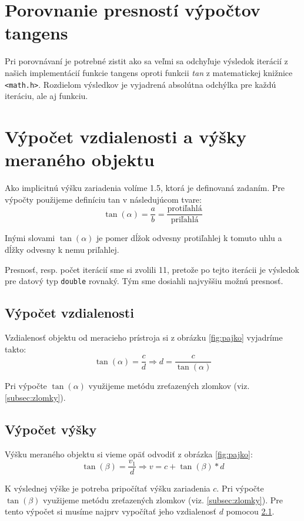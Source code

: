 \documentclass[12pt,a4paper,titlepage,final]{report}
\begin{document}
\section{Porovnanie presností výpočtov tangens}
Pri porovnávaní je potrebné zistit ako sa veľmi sa odchyľuje výsledok iterácií z našich implementácií funkcie tangens oproti funkcii \textit{tan} z matematickej knižnice \texttt{<math.h>}. Rozdielom výsledkov je vyjadrená absolútna odchýlka pre každú iteráciu, ale aj funkciu.

\section{Výpočet vzdialenosti a výšky meraného objektu}
Ako implicitnú výšku zariadenia volíme 1.5, ktorá je definovaná zadaním. Pre výpočty použijeme definíciu tan v následujúcom tvare:
\begin{equation}
\tan(\alpha)=\frac{a}{b}=\frac{\text{protiľahlá}}{\text{priľahlá}}
\end{equation}

Inými slovami $\tan(\alpha)$ je pomer dĺžok odvesny protiľahlej k tomuto uhlu a dĺžky odvesny k nemu priľahlej.

Presnosť, resp. počet iterácií sme si zvolili 11, pretože po tejto iterácii je výsledok pre datový typ \texttt{double} rovnaký. Tým sme dosiahli najvyššiu možnú presnosť.

\subsection{Výpočet vzdialenosti} \label{subsec:vypocet_vzdialenost}
Vzdialenosť objektu od meracieho prístroja si z obrázku \ref{fig:pajko} vyjadríme takto:
\begin{equation}
\tan(\alpha)=\frac{c}{d} \Rightarrow d=\frac{c}{\tan(\alpha)}
\end{equation}

Pri výpočte $\tan(\alpha)$ využijeme metódu zreťazených zlomkov (viz. \ref{subsec:zlomky}).

\subsection{Výpočet výšky}
Výšku meraného objektu si vieme opäť odvodiť z obrázka \ref{fig:pajko}:
\begin{equation}
\tan(\beta)=\frac{v_1}{d} \Rightarrow v = c + \tan(\beta) * d
\end{equation}

K výslednej výške je potreba pripočítať výšku zariadenia $c$. Pri výpočte $\tan(\beta)$ využijeme metódu zreťazených zlomkov (viz. \ref{subsec:zlomky}). Pre tento výpočet si musíme najprv vypočítať jeho vzdialenosť $d$ pomocou \ref{subsec:vypocet_vzdialenost}.
\end{document}
